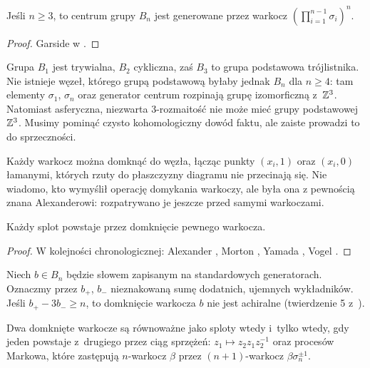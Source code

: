 \begin{proposition}
    Jeśli $n \ge 3$, to centrum grupy $B_n$ jest generowane przez warkocz $(\prod_{i = 1}^{n-1} \sigma_i)^n$.
\end{proposition}

\begin{proof}
    Garside w \cite{garside69}.
\end{proof}

Grupa $B_1$ jest trywialna, $B_2$ cykliczna, zaś $B_3$ to grupa podstawowa trójlistnika.
Nie istnieje węzeł, którego grupą podstawową byłaby jednak $B_n$ dla $n \ge 4$: tam elementy $\sigma_1$, $\sigma_n$ oraz generator centrum rozpinają grupę izomorficzną z~$\mathbb Z^3$.
Natomiast asferyczna, niezwarta 3-rozmaitość nie może mieć grupy podstawowej $\mathbb Z^3$.
Musimy pominąć czysto kohomologiczny dowód faktu, ale zaiste prowadzi to do sprzeczności.

Każdy warkocz można domknąć do węzła, łącząc punkty $(x_i, 1)$ oraz $(x_i, 0)$
łamanymi, których rzuty do płaszczyzny diagramu nie przecinają się.
Nie wiadomo, kto wymyślił operację domykania warkoczy, ale była ona z pewnością znana Alexanderowi: rozpatrywano je jeszcze przed samymi warkoczami.

\begin{theorem}[Alexander, 1923]
    \label{alex_thm}
     Każdy splot powstaje przez domknięcie pewnego warkocza.
\end{theorem}

\begin{proof}
    W kolejności chronologicznej: Alexander \cite{alexander23}, Morton \cite{mortonhr86}, Yamada \cite{yamada87}, Vogel \cite{vogel90}.
\end{proof}

Niech $b \in B_n$ będzie słowem zapisanym na standardowych generatorach.
Oznaczmy przez $b_+$, $b_-$ nieznakowaną sumę dodatnich, ujemnych wykładników.
Jeśli $b_+ - 3b_- \ge n$, to domknięcie warkocza $b$ nie jest achiralne (twierdzenie 5 z~\cite{jones85}).

\begin{theorem}[Markow, 1936]
    Dwa domknięte warkocze są równoważne jako sploty wtedy i~tylko wtedy,
    gdy jeden powstaje z~drugiego przez ciąg
    sprzężeń: $z_1 \mapsto z_2 z_1 z_2^{-1}$ oraz procesów Markowa,
    które zastępują $n$-warkocz $\beta$ przez $(n+1)$-warkocz $\beta\sigma_n^{\pm 1}$.
\end{theorem}

